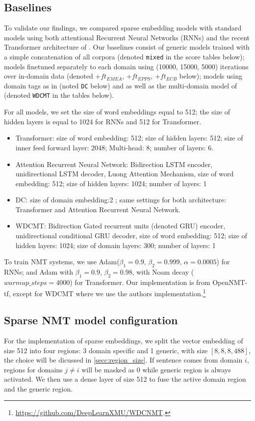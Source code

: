 \documentclass[11pt,a4paper]{article}
\newcommand{\fyTodo}[1]{\Todo[FY:]{\textcolor{orange}{#1}}}
\begin{document}
\subsection{Baselines \label{ssec:baselines}}
To validate our findings, we compared sparse embedding models with standard models using both attentional Recurrent Neural Networks (RNNs) \cite{Bahdanau15learning} and the recent Transformer architecture of \citet{Vaswani17attention}. Our baselines consist of generic models trained with a simple concatenation of all corpora (denoted \texttt{mixed} in the score tables below); models finetuned separately to each domain using (10000, 15000, 5000) iterations over in-domain data (denoted $+ft_{EMEA}$, $+ft_{EPPS}$, $+ft_{ECB}$ below); models using domain tags as in \cite{Kobus17domaincontrol} (noted \texttt{DC} below) and as well as the multi-domain model of \citet{Zeng18multidomain} (denoted \texttt{WDCMT} in the tables below).

For all models, we set the size of word embeddings equal to 512; the size of hidden layers is equal to 1024 for RNNs and 512 for Transformer.
\fyTodo{Improve this}
\begin{itemize}
\item Transformer: size of word embedding: 512; size of hidden layers: 512; size of inner feed forward layer: 2048; Multi-head: 8; number of layers: 6.
\item Attention Recurrent Neural Network: Bidirection LSTM encoder, unidirectional LSTM decoder, Luong Attention Mechanism, size of word embedding: 512; size of hidden layers: 1024; number of layers: 1
\item DC: size of domain embedding:2 ; same settings for both architecture: Transformer and Attention Recurrent Neural Network.
\item WDCMT: Bidirection Gated recurrent units (denoted GRU) encoder, unidirectional conditional GRU decoder, size of word embedding: 512; size of hidden layers: 1024; size of domain layers: 300; number of layers: 1
\end{itemize}
To train NMT systems, we use Adam($\beta_1=0.9$, $\beta_2 = 0.999$, $\alpha=0.0005$) for RNNs; and Adam with $\beta_1=0.9$, $\beta_2= 0.98$, with Noam decay \cite{Vaswani17attention} ($warmup\_steps=4000$) for Transformer.
Our implementation is from OpenNMT-tf\cite{Klein2017OpenNMT}, except for WDCMT where we use the authors implementation.\footnote{\url{https://github.com/DeepLearnXMU/WDCNMT}.}

\subsection{Sparse NMT model configuration}\fyTodo{Change sparse.}
\fyTodo{Motivate the split - discuss experimentally embedding size}
For the implementation of sparse embeddings, we split the vector embedding of size 512 into four regions: 3 domain specific and 1 generic, with size $[8,8,8,488]$, the choice will be dicussed in \ref{secc:region_size}. If sentence comes from domain $i$, regions for domains $j \neq i$ will be masked as 0 while generic region is always activated. We then use a dense layer of size 512 to fuse the active domain region and the generic region.
\end{document}
